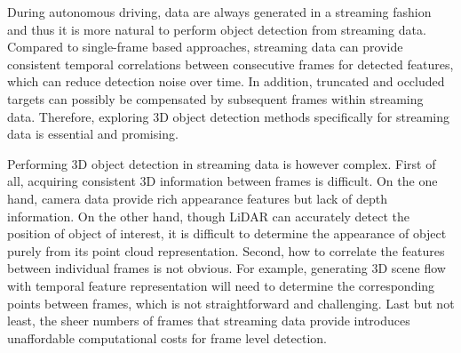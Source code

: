 \documentclass{bmvc2k}
\begin{document}
During autonomous driving, data are always generated in a streaming fashion and thus it is more natural to perform object detection from streaming data. Compared to single-frame based approaches, streaming data can provide consistent temporal correlations between consecutive frames for detected features, which can reduce detection noise over time. In addition, truncated and occluded targets can possibly be compensated by subsequent frames within streaming data. Therefore, exploring 3D object detection methods specifically for streaming data is essential and promising.



Performing 3D object detection in streaming data is however complex. First of all, acquiring consistent 3D information between frames is difficult. On the one hand, camera data provide rich appearance features but lack of depth information. On the other hand, though LiDAR can accurately detect the position of object of interest, it is difficult to determine the appearance of object purely from its point cloud representation. Second, how to correlate the features between individual frames is not obvious. For example, generating 3D scene flow with temporal feature representation will need to determine the corresponding points between frames, which is not straightforward and challenging. Last but not least, the sheer numbers of frames that streaming data provide introduces unaffordable computational costs for frame level detection. 
\end{document}

